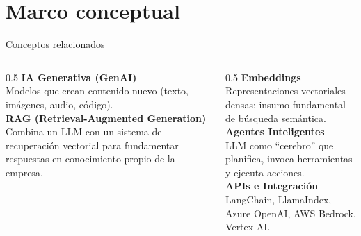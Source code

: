 \documentclass[10pt,aspectratio=169]{beamer}
\begin{document}
\section{Marco conceptual}
\begin{frame}{Conceptos relacionados}
    \begin{columns}[T]
        \begin{column}{0.5\textwidth}
            \textbf{\textcolor{azulPrincipal}{IA Generativa (GenAI)}}\\
            Modelos que crean contenido nuevo (texto, imágenes, audio, código).\\[0.3cm]
            \textbf{\textcolor{azulPrincipal}{RAG (Retrieval-Augmented Generation)}}\\
            Combina un LLM con un sistema de recuperación vectorial para fundamentar respuestas en conocimiento propio de la empresa.\\[0.3cm]
        \end{column}
        \begin{column}{0.5\textwidth}
            \textbf{\textcolor{azulPrincipal}{Embeddings}}\\
            Representaciones vectoriales densas; insumo fundamental de búsqueda semántica.\\[0.3cm]
            \textbf{\textcolor{azulPrincipal}{Agentes Inteligentes}}\\
            LLM como ``cerebro'' que planifica, invoca herramientas y ejecuta acciones.\\[0.3cm]
            \textbf{\textcolor{azulPrincipal}{APIs e Integración}}\\
            LangChain, LlamaIndex, Azure OpenAI, AWS Bedrock, Vertex AI.
        \end{column}
    \end{columns}
\end{frame}
\end{document}

